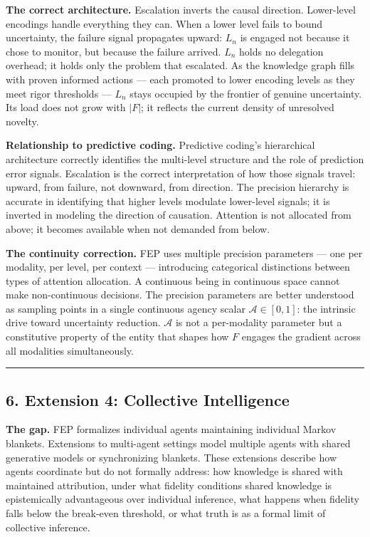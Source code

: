 \documentclass[
]{article}
\begin{document}
\textbf{The correct architecture.} Escalation inverts the causal
direction. Lower-level encodings handle everything they can. When a
lower level fails to bound uncertainty, the failure signal propagates
upward: \(L_n\) is engaged not because it chose to monitor, but because
the failure arrived. \(L_n\) holds no delegation overhead; it holds only
the problem that escalated. As the knowledge graph fills with proven
informed actions --- each promoted to lower encoding levels as they meet
rigor thresholds --- \(L_n\) stays occupied by the frontier of genuine
uncertainty. Its load does not grow with \(|F|\); it reflects the
current density of unresolved novelty.

\textbf{Relationship to predictive coding.} Predictive coding's
hierarchical architecture correctly identifies the multi-level structure
and the role of prediction error signals. Escalation is the correct
interpretation of how those signals travel: upward, from failure, not
downward, from direction. The precision hierarchy is accurate in
identifying that higher levels modulate lower-level signals; it is
inverted in modeling the direction of causation. Attention is not
allocated from above; it becomes available when not demanded from below.

\textbf{The continuity correction.} FEP uses multiple precision
parameters --- one per modality, per level, per context --- introducing
categorical distinctions between types of attention allocation. A
continuous being in continuous space cannot make non-continuous
decisions. The precision parameters are better understood as sampling
points in a single continuous agency scalar \(\mathcal{A} \in [0,1]\):
the intrinsic drive toward uncertainty reduction. \(\mathcal{A}\) is not
a per-modality parameter but a constitutive property of the entity that
shapes how \(F\) engages the gradient across all modalities
simultaneously.

\begin{center}\rule{0.5\linewidth}{0.5pt}\end{center}

\subsection{6. Extension 4: Collective
Intelligence}\label{extension-4-collective-intelligence}

\textbf{The gap.} FEP formalizes individual agents maintaining
individual Markov blankets. Extensions to multi-agent settings
\cite{Friston2021} model multiple agents with shared generative
models or synchronizing blankets. These extensions describe how agents
coordinate but do not formally address: how knowledge is shared with
maintained attribution, under what fidelity conditions shared knowledge
is epistemically advantageous over individual inference, what happens
when fidelity falls below the break-even threshold, or what truth is as
a formal limit of collective inference.
\end{document}
